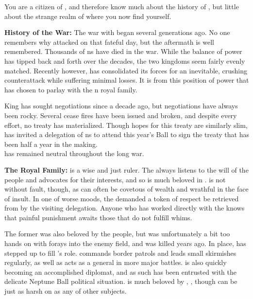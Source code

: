 \documentclass[blue]{NeptuneBall}
\begin{document}
\name{\bPacifican{}}

You are a citizen of \pPacifica{}, and therefore know much about the history of \pPacifica{}, but little about the strange realm of \pAtlantis{} where you now find yourself.

{\bf History of the War:}
The war with \pAtlantis{} began several generations ago. No one remembers why \pAtlantis{} attacked on that fateful day, but the aftermath is well remembered. Thousands of \pPacifica{}ns have died in the war. While the balance of power has tipped back and forth over the decades, the two kingdoms seem fairly evenly matched. Recently however, \pPacifica{} has consolidated its forces for an inevitable, crushing counterattack while suffering minimal losses. It is from this position of power that \cPacificanRuler{\King} \cPacificanRuler{} has chosen to parlay with the \pAtlantis{}n royal family.

King \cKing{\MYname{}} has sought negotiations since a decade ago, but negotiations have always been rocky. Several cease fires have been issued and broken, and despite every effort, no treaty has materialized. Though hopes for this treaty are similarly slim, \cKing{\King} \cKing{} has invited a delegation of \pPacifica{}ns to attend this year's \cExExKing{} Ball to sign the treaty that has been half a year in the making.\\

\pIndia{} has remained neutral throughout the long war.

{\bf The Royal Family:}
\cPacificanRuler{\King} \cPacificanRuler{} is a wise and just ruler. The \cPacificanRuler{\King} always listens to the will of the people and advocates for their interests, and so is much beloved in \pPacifica{}. \cPacificanRuler{\They} is not without fault, though, as \cPacificanRuler{\they} can often be covetous of wealth and wrathful in the face of insult. In one of \cPacificanRuler{\their} worse moods, the \cPacificanRuler{\King} demanded a token of respect be retrieved from \pAtlantis{} by the visiting delegation. Anyone who has worked directly with the \cPacificanRuler{\King} knows that painful punishment awaits those that do not fulfill \cPacificanRuler{\their} whims.

The former \cPacificanRulerSpouse{\King} \cPacificanRulerSpouse{} was also beloved by the people, but was unfortunately a bit too hands on with \cPacificanRulerSpouse{\their} forays into the enemy field, and was killed years ago. In \cPacificanRulerSpouse{\their} place, \cPrince{\Prince} \cPrince{} has stepped up to fill \cPrince{\their} \cPacificanRulerSpouse{\parent}'s role. \cPrince{} commands border patrols and leads small skirmishes regularly, as well as acts as a general in more major battles. \cPrince{} is also quickly becoming an accomplished diplomat, and as such has been entrusted with the delicate Neptune Ball political situation. \cPrince{\they} is much beloved by \cPrince{\their} \cPacificanRuler{\parent}, \cPacificanRuler{\King} \cPacificanRuler{}, though \cPacificanRuler{\they} can be just as harsh on \cPrince{} as any of \cPacificanRuler{\their} other subjects.\\
\end{document}

